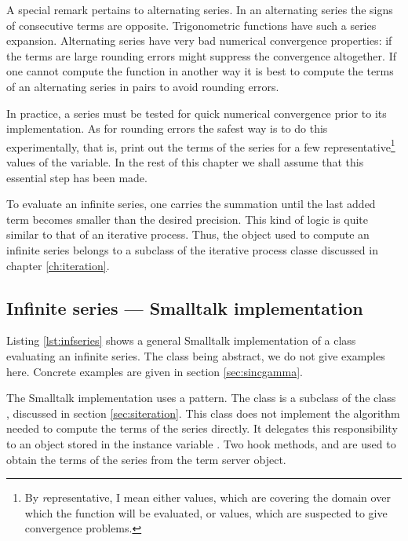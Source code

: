 A special remark pertains to alternating series. In an alternating
series the signs of consecutive terms are opposite. Trigonometric
functions have such a series expansion. Alternating series have
very bad numerical convergence properties: if the terms are large
rounding errors might suppress the convergence altogether. If one
cannot compute the function in another way it is best to compute
the terms of an alternating series in pairs to avoid rounding
errors.

In practice, a series must be tested for quick numerical
convergence prior to its implementation. As for rounding errors
the safest way is to do this experimentally, that is, print out
the terms of the series for a few representative\footnote{By {\textsl
representative}, I mean either values, which are covering the
domain over which the function will be evaluated, or values, which
are suspected to give convergence problems.} values of the
variable. In the rest of this chapter we shall assume that this
essential step has been made.

To evaluate an infinite series, one carries the summation until
the last added term becomes smaller than the desired precision.
This kind of logic is quite similar to that of an iterative
process. Thus, the object used to compute an infinite series
belongs to a subclass of the iterative process classe discussed in
chapter \ref{ch:iteration}.

\subsection{Infinite series --- Smalltalk  implementation}
\label{sec:sseries}
Listing \ref{lst:infseries} shows a general Smalltalk
implementation of a class evaluating an infinite series. The class
being abstract, we do not give examples here. Concrete examples
are given in section \ref{sec:sincgamma}.

The Smalltalk implementation uses a  pattern.
The class  is a subclass of the class , discussed in section \ref{sec:siteration}.
This class does not implement the algorithm needed to compute the
terms of the series directly. It delegates this responsibility to
an object stored in the instance variable . Two
hook methods,  and  are used to
obtain the terms of the series from the term server object.


